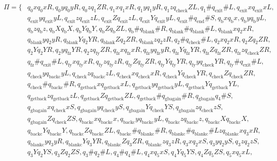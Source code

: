 \documentclass[a4paper,12pt, centered]{article}
\begin{document}
\begin{enumerate}
\begin{align*}
				\Pi=\{&q_0xq_0xR, q_0yq_0yR, q_0zq_1ZR, q_1xq_1xR, q_1yq_1yR, q_1zq_{\textrm{check}}ZL, q_1\#q_{\textrm{exit}}\#L, q_{\textrm{exit}}xq_{\textrm{exit}}xL,\\& q_{\textrm{exit}}yq_{\textrm{exit}}yL, q_{\textrm{exit}}zq_{\textrm{exit}}zL,q_{\textrm{exit}}Zq_{\textrm{exit}}zL, q_{\textrm{exit}}Yq_{\textrm{exit}}yL, q_{\textrm{exit}}\#q_{\textrm{end}}\#S, q_{\textrm{b}}xq_{\textrm{b}}x, q_{\textrm{b}}yq_{\textrm{b}}yL,\\& q_{\textrm{b}}zq_{\textrm{b}}z, q_{\textrm{b}}Xq_{\textrm{b}}X, q_{\textrm{b}}Yq_{\textrm{b}}Y, q_{\textrm{b}}Zq_{\textrm{b}}ZL, q_{\textrm{b}}\#q_{\textrm{blank}}\#R, q_{\textrm{blank}}\#q_{\textrm{blank}}\#L, q_{\textrm{blank}}xq_2xR,\\& q_{\textrm{blank}}yq_2yR, q_{\textrm{blank}}Yq_2YR, q_{\textrm{blank}}Zq_2ZR, q_{\textrm{blank}}zq_2zR, q_2\#q_{\textrm{check}}\#L, q_2xq_2xR, q_2Zq_2ZR,\\& q_2Yq_2YR, q_2yq_{\textrm{fz}}YR, q_2zq_{\textrm{fy}}ZR, q_{\textrm{fz}}xq_{\textrm{fz}}xR, q_{\textrm{fz}}yq_{\textrm{fz}}yR, q_{\textrm{fz}}Yq_{\textrm{fz}}YR, q_{\textrm{fz}}Zq_{\textrm{fz}}ZR, q_{\textrm{fz}}zq_{\textrm{check}}ZR,\\& q_{\textrm{fz}}\#q_{\textrm{exit}}\#L, q_{\textrm{fy}}xq_{\textrm{fy}}xR, q_{\textrm{fy}}zq_{\textrm{fy}}zR, q_{\textrm{fy}}Zq_{\textrm{fy}}ZR, q_{\textrm{fy}}Yq_{\textrm{fy}}YR, q_{\textrm{fy}}yq_{\textrm{check}}YR, q_{\textrm{fy}}\#q_{\textrm{exit}}\#L,\\& q_{\textrm{check}}yq_{\textrm{backc}}yL, q_{\textrm{check}}zq_{\textrm{backc}}zL, q_{\textrm{check}}xq_{\textrm{check}}xR, q_{\textrm{check}}Yq_{\textrm{check}}YR, q_{\textrm{check}}Zq_{\textrm{check}}ZR,\\& q_{\textrm{check}}\#q_{\textrm{backc}}\#R, q_{\textrm{getback}}xq_{\textrm{getback}}xL, q_{\textrm{getback}}yq_{\textrm{getback}}yL, q_{\textrm{getback}}Yq_{\textrm{getback}}YL,\\& q_{\textrm{getback}}zq_{\textrm{getback}}zL, q_{\textrm{getback}}Zq_{\textrm{getback}}ZL, q_{\textrm{getback}}\#q_{\textrm{gbagain}}\#R, q_{\textrm{gbagain}}q_4\#S,\\& q_{\textrm{gbagain}}xq_{\textrm{check}}xS, q_{\textrm{gbagain}}yq_{\textrm{check}}yS, q_{\textrm{gbagain}}Yq_{\textrm{check}}YS, q_{\textrm{gbagain}}zq_{\textrm{check}}zS, \\&q_{\textrm{gbagain}}Zq_{\textrm{check}}ZS, q_{\textrm{backc}}xq_{\textrm{backc}}x, q_{\textrm{backc}}yq_{\textrm{backc}}yL, q_{\textrm{backc}}zq_{\textrm{backc}}z, q_{\textrm{backc}}Xq_{\textrm{backc}}X, \\&q_{\textrm{backc}}Yq_{\textrm{backc}}Y, q_{\textrm{backc}}Zq_{\textrm{backc}}ZL, q_{\textrm{backc}}\#q_{\textrm{blankc}}\#R, q_{\textrm{blankc}}\#q_{\textrm{blankc}}\#Lz q_{\textrm{blankc}}xq_3xR, \\&q_{\textrm{blankc}}yq_3yR, q_{\textrm{blankc}}Yq_3YR, q_{\textrm{blankc}}Zq_3ZR, q_{\textrm{blankc}}zq_3zR, q_3xq_2xS, q_3yq_2yS, q_3zq_2zS,\\& q_3Yq_2YS, q_3Zq_2ZS, q_3\#q_2\#L, q_4\#q_4\#L, q_4xq_5xS, q_4Yq_5YS, q_4Zq_5ZS, q_5xq_5xL,\\& 
\end{align*}
\end{enumerate}
\end{document}
